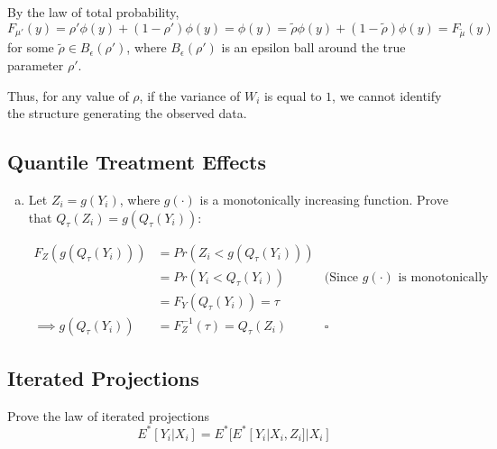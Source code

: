 \documentclass[11pt]{article}
\begin{document}
By the law of total probability, $$F_{\mu'}(y) = \rho' \phi(y) + (1-\rho')\phi(y) = \phi(y) = \tilde \rho \phi(y) + (1-\tilde \rho)\phi(y) = F_{\tilde \mu}(y)$$ for some $\tilde \rho \in B_{\epsilon}(\rho')$, where $B_{\epsilon}(\rho')$ is an epsilon ball around the true parameter $\rho'$. 

Thus, for any value of $\rho$, if the variance of $W_i$ is equal to $1$, we cannot identify the structure generating the observed data.

\subsection*{Quantile Treatment Effects}

\begin{enumerate}[a)]

	\item Let $Z_i = g(Y_i)$, where $g(\cdot)$ is a monotonically increasing function. Prove that $Q_{\tau}(Z_i) = g(Q_{\tau}(Y_i))$:

	\begin{align*}
		F_Z(g(Q_{\tau}(Y_i))) &= Pr(Z_i < g(Q_{\tau}(Y_i))) \\
		&= Pr(Y_i < Q_{\tau}(Y_i)) &\mbox{(Since $g(\cdot)$ is monotonically increasing)} \\
		&= F_Y(Q_{\tau}(Y_i)) = \tau \\
		\implies g(Q_{\tau}(Y_i)) &= F_Z^{-1}(\tau) = Q_{\tau}(Z_i) &\square
	\end{align*}
	

\end{enumerate}


\subsection*{Iterated Projections}
Prove the law of iterated projections 
$$E^*[Y_i|X_i] = E^*[E^*[Y_i|X_i,Z_i]|X_i]$$
\end{document}
